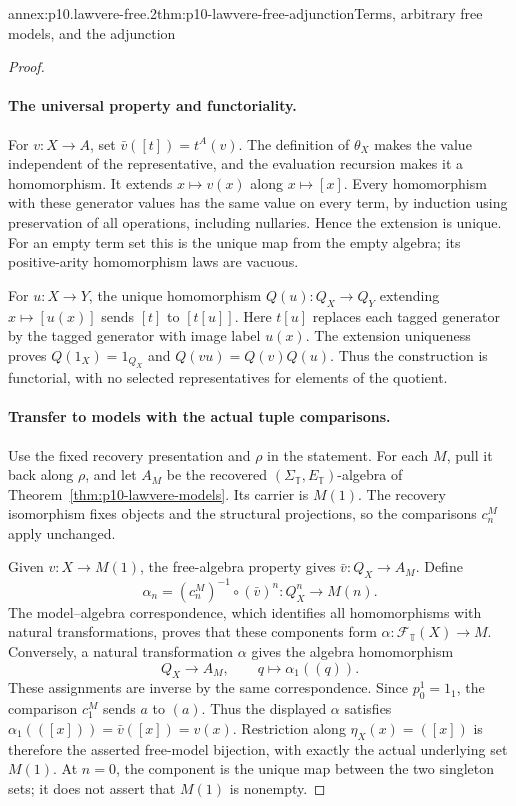 \begin{annexitem}{annex:p10.lawvere-free.2}{thm:p10-lawvere-free-adjunction}{Terms, arbitrary free models, and the adjunction}
\begin{proof}
\paragraph{The universal property and functoriality.}
For \(v:X\to A\), set \(\bar v([t])=t^A(v)\).
The definition of \(\theta_X\) makes the value independent of the
representative, and the evaluation recursion makes it a homomorphism.
It extends \(x\mapsto v(x)\) along \(x\mapsto[x]\).
Every homomorphism with these generator values has the same value on
every term, by induction using preservation of all operations, including
nullaries.  Hence the extension is unique.
For an empty term set this is the unique map from the empty algebra;
its positive-arity homomorphism laws are vacuous.

For \(u:X\to Y\), the unique homomorphism
\(Q(u):Q_X\to Q_Y\) extending \(x\mapsto[u(x)]\) sends
\([t]\) to \([t[u]]\).
Here \(t[u]\) replaces each tagged generator by the tagged generator
with image label \(u(x)\).
The extension uniqueness proves \(Q(1_X)=1_{Q_X}\) and
\(Q(vu)=Q(v)Q(u)\).
Thus the construction is functorial, with no selected representatives
for elements of the quotient.

\paragraph{Transfer to models with the actual tuple comparisons.}
Use the fixed recovery presentation and \(\rho\) in the statement.
For each \(M\), pull it back along \(\rho\), and let \(A_M\) be
the recovered \((\Sigma_{\mathbb T},E_{\mathbb T})\)-algebra of
Theorem~\ref{thm:p10-lawvere-models}.
Its carrier is \(M(1)\).
The recovery isomorphism fixes objects and the structural projections,
so the comparisons \(c_n^M\) apply unchanged.

Given \(v:X\to M(1)\), the free-algebra property gives
\(\bar v:Q_X\to A_M\).
Define
\[
 \alpha_n=(c_n^M)^{-1}\circ(\bar v)^n:
                Q_X^n\longrightarrow M(n).
\]
The model--algebra correspondence, which identifies all homomorphisms
with natural transformations, proves that these components form
\(\alpha:\mathcal F_{\mathbb T}(X)\to M\).
Conversely, a natural transformation \(\alpha\) gives the algebra
homomorphism
\[
 Q_X\longrightarrow A_M,\qquad q\longmapsto\alpha_1((q)).
\]
These assignments are inverse by the same correspondence.
Since \(p_0^1=1_1\), the comparison \(c_1^M\) sends \(a\) to \((a)\).
Thus the displayed \(\alpha\) satisfies
\(\alpha_1(([x]))=\bar v([x])=v(x)\).
Restriction along \(\eta_X(x)=([x])\) is therefore the asserted
free-model bijection, with exactly the actual underlying set \(M(1)\).
At \(n=0\), the component is the unique map between the two singleton
sets; it does not assert that \(M(1)\) is nonempty.


\end{proof}
\end{annexitem}
